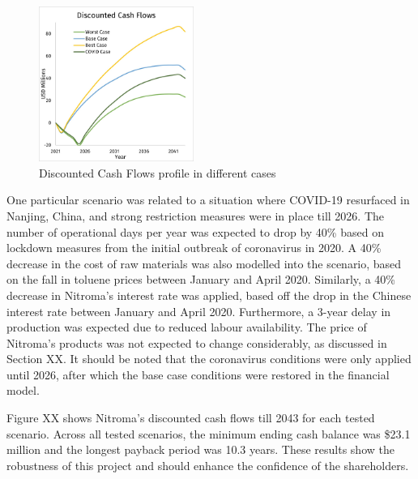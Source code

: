 \begin{figure}
    \caption{Discounted Cash Flows profile in different cases}
    \label{DCF_scenario}
    \includegraphics[width=0.45\textwidth]{chapters/6-economics/figures/DCF.jpg}
\end{figure}

One particular scenario was related to a situation where COVID-19 resurfaced in Nanjing, China, and strong restriction measures were in place till 2026. The number of operational days per year was expected to drop by 40\% based on lockdown measures from the initial outbreak of coronavirus in 2020. A 40\% decrease in the cost of raw materials was also modelled into the scenario, based on the fall in toluene prices between January and April 2020. Similarly, a 40\% decrease in Nitroma’s interest rate was applied, based off the drop in the Chinese interest rate between January and April 2020. Furthermore, a 3-year delay in production was expected due to reduced labour availability. The price of Nitroma’s products was not expected to change considerably, as discussed in Section XX. It should be noted that the coronavirus conditions were only applied until 2026, after which the base case conditions were restored in the financial model.

Figure XX shows Nitroma’s discounted cash flows till 2043 for each tested scenario. Across all tested scenarios, the minimum ending cash balance was \$23.1 million and the longest payback period was 10.3 years. These results show the robustness of this project and should enhance the confidence of the shareholders.
